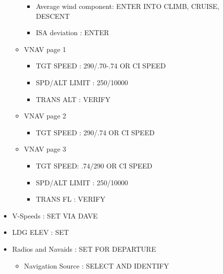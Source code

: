 \begin{itemize}
\begin{itemize}
\begin{itemize}
\item Average wind component: ENTER INTO CLIMB, CRUISE, DESCENT

\item ISA deviation : ENTER

\end{itemize}

\item VNAV page 1

\begin{itemize}
\item TGT SPEED : 290\slash .70-.74 OR CI SPEED

\item SPD\slash ALT LIMIT : 250\slash 10000

\item TRANS ALT : VERIFY

\end{itemize}

\item VNAV page 2

\begin{itemize}
\item TGT SPEED : 290\slash .74 OR CI SPEED

\end{itemize}

\item VNAV page 3

\begin{itemize}
\item TGT SPEED: .74\slash 290 OR CI SPEED

\item SPD\slash ALT LIMIT : 250\slash 10000

\item TRANS FL : VERIFY

\end{itemize}

\end{itemize}

\item V-Speeds : SET VIA DAVE

\item LDG ELEV : SET

\item Radios and Navaids : SET FOR DEPARTURE

\begin{itemize}
\item Navigation Source : SELECT AND IDENTIFY


\end{itemize}
\end{itemize}
